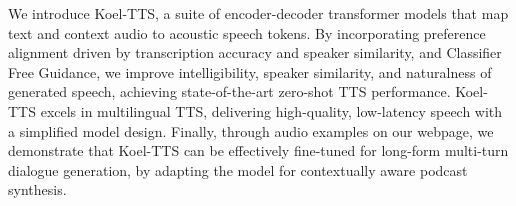 We introduce Koel-TTS, a suite of encoder-decoder transformer models that map text and context audio to acoustic speech tokens. 
By incorporating preference alignment driven by transcription accuracy and speaker similarity, and Classifier Free Guidance,
we improve intelligibility, speaker similarity, and naturalness of generated speech,  achieving state-of-the-art zero-shot TTS performance. 
Koel-TTS excels in multilingual TTS, delivering high-quality, low-latency speech with a simplified model design. Finally, through audio examples on our webpage, we demonstrate that Koel-TTS can be effectively fine-tuned for long-form multi-turn dialogue generation, by adapting the model for contextually aware podcast synthesis.